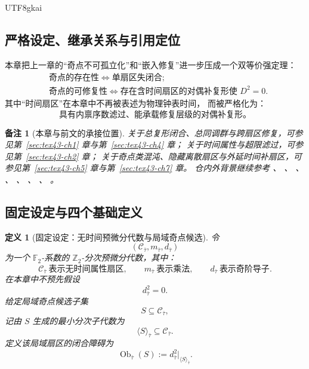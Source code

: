 \documentclass[12pt]{article}
\newtheorem{definition}{定义}[section]
\newtheorem{remark}{备注}[section]
\newcommand{\Ztwo}{\mathbb{Z}_2}
\newcommand{\Ftwo}{\mathbb{F}_2}
\begin{document}
\begin{CJK*}{UTF8}{gkai}
\subsection{严格设定、继承关系与引用定位}
\label{subsec:tex43-ch8-convention}

本章把上一章的“奇点不可孤立化”和“嵌入修复”进一步压成一个双等价强定理：
\[
  \boxed{
    \begin{aligned}
      &\text{奇点的存在性}\iff \text{单扇区失闭合};\\
      &\text{奇点的可修复性}\iff \text{存在含时间扇区的对偶补复形使 }D^2=0.
    \end{aligned}
  }
\]
其中“时间扇区”在本章中不再被表述为物理钟表时间，
而被严格化为：
\[
  \boxed{
    \text{具有内禀序数滤过、能承载修复层级的对偶补复形。}
  }
\]

\begin{remark}[本章与前文的承接位置]
关于总复形闭合、总同调群与跨扇区修复，可参见第~\ref{sec:tex43-ch1} 章与第~\ref{sec:tex43-ch4} 章；
关于时间属性与超限滤过，可参见第~\ref{sec:tex43-ch2} 章；
关于奇点类混沌、隐藏离散扇区与外延时间补扇区，可参见第~\ref{sec:tex43-ch5} 章与第~\ref{sec:tex43-ch7} 章。
仓内外背景继续参考
\cite{RepoTex29RepairableObstruction}、
\cite{RepoTex38JacobiBianchiRepair}、
\cite{RepoTex39StatRepair}、
\cite{GaoZheng2025GFramework}、
\cite{Weibel1994HomologicalAlgebra}、
\cite{Hatcher2002AT}、
\cite{Jech2003SetTheory}、
\cite{Kunen2011SetTheory}。
\end{remark}

\subsection{固定设定与四个基础定义}
\label{subsec:tex43-ch8-definitions}

\begin{definition}[固定设定：无时间预微分代数与局域奇点候选]
\label{def:tex43-singularity-fixed-setting}
令
\[
  (\mathcal C_{\bar\tau},m_{\bar\tau},d_{\bar\tau})
\]
为一个 $\Ftwo$-系数的 $\Ztwo$-分次预微分代数，其中：
\[
  \mathcal C_{\bar\tau}\ \text{表示无时间属性扇区},
  \qquad
  m_{\bar\tau}\ \text{表示乘法},
  \qquad
  d_{\bar\tau}\ \text{表示奇阶导子}.
\]
在本章中不预先假设
\[
  d_{\bar\tau}^2=0.
\]
给定局域奇点候选子集
\[
  S\subseteq \mathcal C_{\bar\tau},
\]
记由 $S$ 生成的最小分次子代数为
\[
  \langle S\rangle_{\bar\tau}\subseteq \mathcal C_{\bar\tau}.
\]
定义该局域扇区的闭合障碍为
\[
  \operatorname{Ob}_{\bar\tau}(S)
  :=
  d_{\bar\tau}^2\big|_{\langle S\rangle_{\bar\tau}}.
\]
\end{definition}


\end{CJK*}
\end{document}
